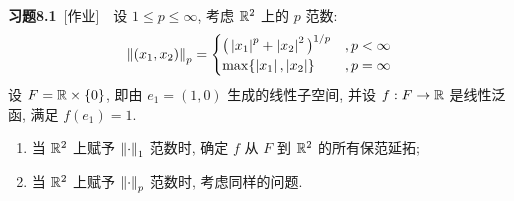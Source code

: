 	\textbf{习题8.1}\ [作业]\ \ 设 $ 1\leqslant p\leqslant\infty $, 考虑 $ \mathbb{R}^{2} $ 上的 $ p $ 范数:
	\[
		\left\| (x_{1}, x_{2}) \right\|_{p}=
		\begin{cases}
			\big( \left| x_{1} \right| ^{p}+\left| x_{2} \right| ^{2} \big)^{1/p} & ,p<\infty\\
			\max\{\left| x_{1} \right| , \left| x_{2} \right| \} & ,p = \infty
		\end{cases}
	\]
	设 $ F=\mathbb{R}\times\{ 0 \} $, 即由 $ e_{1}=(1, 0) $ 生成的线性子空间, 并设 $ f:F\to\mathbb{R} $ 是线性泛函, 满足 $ f(e_{1})=1 $.
	\begin{enumerate}[(1)]
		\item 当 $ \mathbb{R}^{2} $ 上赋予 $ \left\| \cdot \right\|_{1} $ 范数时, 确定 $ f $ 从 $ F $ 到 $ \mathbb{R}^{2} $ 的所有保范延拓;
		\item 当 $ \mathbb{R}^{2} $ 上赋予 $ \left\| \cdot \right\|_{p} $ 范数时, 考虑同样的问题.
	\end{enumerate}
